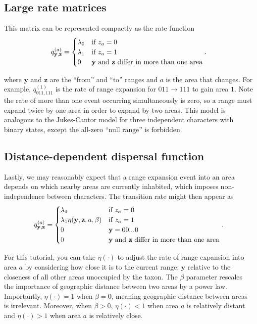 \subsection{Large rate matrices}

This matrix can be represented compactly as the rate function
\[
q^{(a)}_{\textbf{y},\textbf{z}} =
\begin{cases}
\lambda_0 & \text{if $z_a=0$} \\
\lambda_1 & \text{if $z_a=1$} \\
0 & \text{\textbf{y} and \textbf{z} differ in more than one area}
\end{cases}.
\]

where $\textbf{y}$ and $\textbf{z}$ are the ``from'' and ``to'' ranges and $a$ is the area that changes.
For example, $q^{(1)}_{011,111}$ is the rate of range expansion for $011 \rightarrow 111$ to gain area $1$.
Note the rate of more than one event occurring simultaneously is zero, so a range must expand twice by one area in order to expand by two areas.
This model is analogous to the Jukes-Cantor model for three independent characters with binary states, except the all-zero ``null range'' is forbidden.



\subsection{Distance-dependent dispersal function}

Lastly, we may reasonably expect that a range expansion event into an area depends on which nearby areas are currently inhabited, which imposes non-independence between characters.
The transition rate might then appear as
\[
q^{(a)}_{\textbf{y},\textbf{z}} =
\begin{cases}
\lambda_0 & \text{if $z_a=0$}  \\
\lambda_1 \eta(\textbf{y}, \textbf{z}, a, \beta) & \text{if $z_a=1$} \\
0 & \mathbf{y} = 00...0 \\
0 & \text{\textbf{y} and \textbf{z} differ in more than one area}
\end{cases}.
\]

For this tutorial, you can take $\eta(\cdot)$ to adjust the rate of range expansion into area $a$ by considering how close it is to the current range, $\textbf{y}$ relative to the closeness of all other areas unoccupied by the taxon.
The $\beta$ parameter rescales the importance of geographic distance between two areas by a power law.
Importantly, $\eta(\cdot) = 1$ when $\beta=0$, meaning geographic distance between areas is irrelevant.
Moreover, when $\beta > 0$, $\eta(\cdot) < 1$ when area $a$ is relatively distant and $\eta(\cdot) > 1$ when area $a$ is relatively close.



